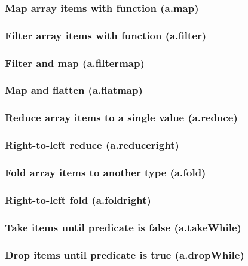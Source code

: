 \documentclass{article}
\theoremstyle{definition}
\begin{document}
\subsubsection{Map array items with function (a.map)}

\subsubsection{Filter array items with function (a.filter)}

\subsubsection{Filter and map (a.filtermap)}

\subsubsection{Map and flatten (a.flatmap)}

\subsubsection{Reduce array items to a single value (a.reduce)}

\subsubsection{Right-to-left reduce (a.reduceright)}

\subsubsection{Fold array items to another type (a.fold)}

\subsubsection{Right-to-left fold (a.foldright)}

\subsubsection{Take items until predicate is false (a.takeWhile)}

\subsubsection{Drop items until predicate is true (a.dropWhile)}
\end{document}
